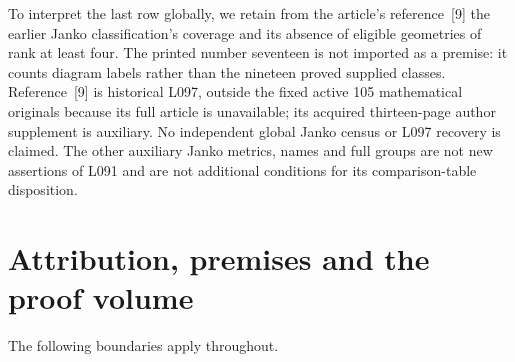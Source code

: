 To interpret the last row globally, we retain from the article's
reference~[9] the earlier Janko classification's coverage and its absence
of eligible geometries of rank at least four. The printed number seventeen
is not imported as a premise: it counts diagram labels rather than the
nineteen proved supplied classes. Reference~[9] is historical L097,
outside the fixed active 105 mathematical originals because its full
article is unavailable; its acquired thirteen-page author supplement
is auxiliary. No independent global Janko census or L097 recovery is
claimed. The other auxiliary Janko metrics, names and full groups are
not new assertions of L091 and are not additional conditions for its
comparison-table disposition.

\section{Attribution, premises and the proof volume}\label{premises}
The following boundaries apply throughout.
